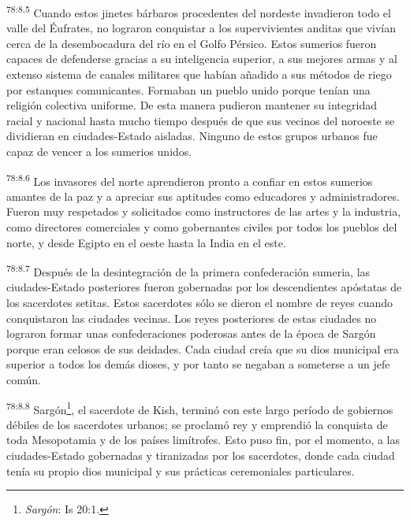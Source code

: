 \par
\textsuperscript{78:8.5} Cuando estos jinetes bárbaros procedentes del nordeste invadieron todo el valle del Éufrates, no lograron conquistar a los supervivientes anditas que vivían cerca de la desembocadura del río en el Golfo Pérsico. Estos sumerios fueron capaces de defenderse gracias a su inteligencia superior, a sus mejores armas y al extenso sistema de canales militares que habían añadido a sus métodos de riego por estanques comunicantes. Formaban un pueblo unido porque tenían una religión colectiva uniforme. De esta manera pudieron mantener su integridad racial y nacional hasta mucho tiempo después de que sus vecinos del noroeste se dividieran en ciudades-Estado aisladas. Ninguno de estos grupos urbanos fue capaz de vencer a los sumerios unidos.

\par
\textsuperscript{78:8.6} Los invasores del norte aprendieron pronto a confiar en estos sumerios amantes de la paz y a apreciar sus aptitudes como educadores y administradores. Fueron muy respetados y solicitados como instructores de las artes y la industria, como directores comerciales y como gobernantes civiles por todos los pueblos del norte, y desde Egipto en el oeste hasta la India en el este.

\par
\textsuperscript{78:8.7} Después de la desintegración de la primera confederación sumeria, las ciudades-Estado posteriores fueron gobernadas por los descendientes apóstatas de los sacerdotes setitas. Estos sacerdotes sólo se dieron el nombre de reyes cuando conquistaron las ciudades vecinas. Los reyes posteriores de estas ciudades no lograron formar unas confederaciones poderosas antes de la época de Sargón porque eran celosos de sus deidades. Cada ciudad creía que su dios municipal era superior a todos los demás dioses, y por tanto se negaban a someterse a un jefe común.

\par
\textsuperscript{78:8.8} Sargón\footnote{\textit{Sargón}: Is 20:1.}, el sacerdote de Kish, terminó con este largo período de gobiernos débiles de los sacerdotes urbanos; se proclamó rey y emprendió la conquista de toda Mesopotamia y de los países limítrofes. Esto puso fin, por el momento, a las ciudades-Estado gobernadas y tiranizadas por los sacerdotes, donde cada ciudad tenía su propio dios municipal y sus prácticas ceremoniales particulares.

